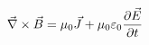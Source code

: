 \documentclass[preview]{standalone}
\begin{document}
\begin{align*}
\special{dvisvgm:raw <g id='unique000'>}\vec{\nabla} \times \vec{B} = \mu_0 \vec{J} + \mu_0 \varepsilon_0 \frac{\partial \vec{E}}{\partial t}\special{dvisvgm:raw </g>}
\end{align*}
\end{document}
